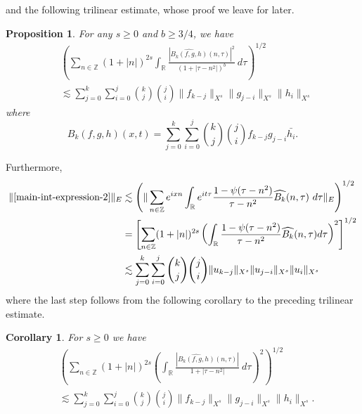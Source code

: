 \documentclass[12pt,reqno]{amsart}
\numberwithin{equation}{section}  %
\numberwithin{figure}{section}
\newcommand{\rr}{\mathbb{R}}
\newcommand{\zz}{\mathbb{Z}}
\newcommand{\wh}{\widehat}
\theoremstyle{plain}
\newtheorem{proposition}{Proposition}
\newtheorem{corollary}{Corollary}
\theoremstyle{definition}
\theoremstyle{remark}
\begin{document}
%
%
and the following trilinear estimate, whose proof we leave for later.
%
%
%
%
%
%
%
%
\begin{proposition}
\label{prop:trilinear-est}
  For any $s \ge 0$ and $b \ge 3/4$, we have
  \begin{equation}
    \begin{split}
    & \left( \sum_{n \in \zz} \left (1 + |n| \right )^{2s} \int_\rr
    \frac{|\wh{{B_k}(f,g,h)}(n, \tau) |^2}{\left (1+ |\tau - 
    n^{2}| \right ) ^b} 
     \ d \tau 
    \right)^{1/2}
    \\
    & \lesssim \sum_{j=0}^{k} \sum_{i=0}^{j} {k \choose j}{j \choose i}
    \|f_{k-j}\|_{X^s} \| g_{j-i}\|_{X^s}
    \| h_i \|_{X^s}
  \end{split}
  \end{equation}
  where $$B_k(f,g,h)(x,t) = \sum_{j=0}^{k} \sum_{i=0}^{j} {k \choose j}{j \choose
  i} f_{k-j} g_{j-i} \bar{h_i}.$$
%
%
%
%
\end{proposition}
%
%
Furthermore,
%
%
%
%
\begin{equation}
  \label{main-int-expression-2-Y-s-part}
  \begin{split}
    \|\eqref{main-int-expression-2} \|_{E}
    & \lesssim \left( \| \sum_{n \in \zz} e^{ixn} \int_\rr 
    e^{it \tau} \frac{ 1 - \psi (\tau - n^{2} ) 
    }{\tau - n^{2}} \wh{{B_k}}(n, \tau) \ 
    d \tau\|_{E} \right)^{1/2}
    \\
    & = \left[ \sum_{n \in \zz}(1 + | n |)^{2s} \left(
    \int_{\rr}\frac{1 - \psi(\tau - n^{2})}{\tau - n^{2}} \wh{{B_k}}(n, \tau) d
    \tau \right)^{2} \right]^{1/2}
    \\
    & \lesssim \sum_{j=0}^{k} \sum_{i=0}^{j} {k \choose j}{j \choose i}
    \|u_{k-j}\|_{X^s} \| u_{j-i}\|_{X^s}
    \| u_i \|_{X^s}
  \end{split}
\end{equation}
%
%
where the last step follows from the following corollary to the preceding trilinear
estimate.
%
%
%
%
%
%
%
%
\begin{corollary}
\label{cor:trilinear-estimate2}
  For $s \ge 0$ we have
%
%
\begin{equation}
  \label{trilinear-estimate2}
  \begin{split}
    & \left( \sum_{n \in \zz} \left (1 + |n| \right )^{2s}  \left ( \int_\rr 
    \frac{|\wh{{B_k}(f,g,h)}(n, \tau) |}{1 + | \tau - n^{2} |}
     \ d\tau \right)^2  \right)^{1/2} 
     \\
     & \lesssim \sum_{j=0}^{k} \sum_{i=0}^{j} {k \choose j}{j \choose i}
    \|f_{k-j}\|_{X^s} \| g_{j-i}\|_{X^s}
    \| h_i \|_{X^s}.
  \end{split}
\end{equation}
\end{corollary}
\end{document}
